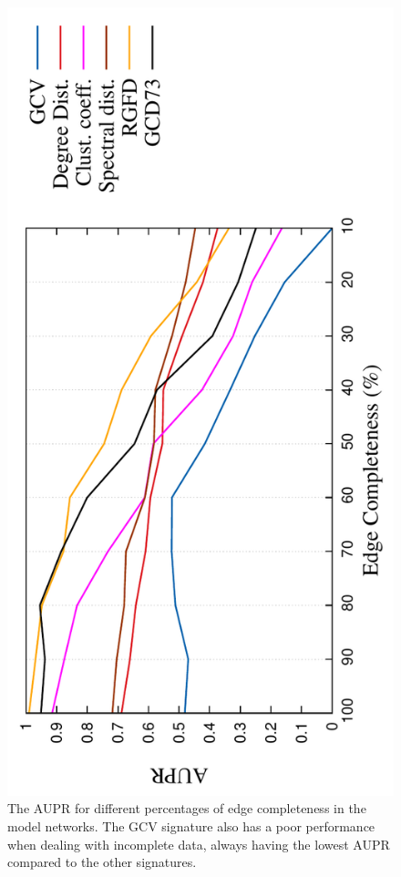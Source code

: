 \begin{figure}[H]
  \hspace{-1.5em}
  \includegraphics[scale=0.7, angle=-90]
  {../code/final_results/trade_2010_thresholded/eval_results/compl_aupr_all_sigs2.pdf}
  \caption[The AUPR for different percentages of edge completeness in the model networks]{The AUPR for different percentages of edge completeness in the model networks. The GCV signature also has a poor performance when dealing with incomplete data, always having the lowest AUPR compared to the other signatures.}
  \label{fig:compl_aupr}
\end{figure}

